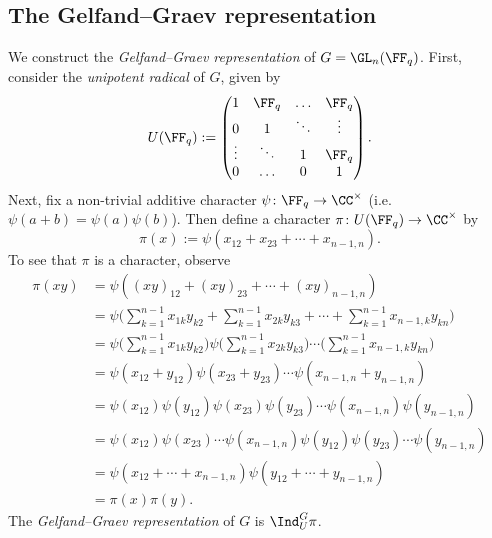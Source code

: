 \documentclass[11pt]{amsart}
\theoremstyle{remark}
\begin{document}
\subsection{The Gelfand--Graev representation}\label{Section2.4}
We construct the \emph{Gelfand--Graev representation} of $G=\GL_n(\FF_q)$.
First, consider the \emph{unipotent radical} of $G$, given by
\[
	U(\FF_q) := \begin{pmatrix}
		1      & \FF_q  & \hdots & \FF_q  \\
		0      & 1      & \ddots & \vdots \\
		\vdots & \ddots & 1      & \FF_q  \\
		0      & \hdots & 0      & 1
	\end{pmatrix}.
\]
Next, fix a non-trivial additive character $\psi\colon \FF_q\to\CC^\times$ (i.e.\ $\psi(a+b)=\psi(a)\psi(b)$).
Then define a character $\pi\colon U(\FF_q)\to\CC^\times$ by
\[
	\pi(x) := \psi(x_{12}+x_{23}+\cdots+x_{n-1,n}).
\]
To see that $\pi$ is a character, observe
\begin{align*}
	\pi(xy) & = \psi((xy)_{12} + (xy)_{23} + \cdots + (xy)_{n-1,n})                                                                                          \\
	        & = \psi\bigg(\sum_{k=1}^{n-1} x_{1k}y_{k2} + \sum_{k=1}^{n-1} x_{2k}y_{k3} + \cdots + \sum_{k=1}^{n-1} x_{n-1,k}y_{kn}\bigg)                    \\
	        & = \psi\bigg(\sum_{k=1}^{n-1} x_{1k}y_{k2}\bigg)\psi\bigg(\sum_{k=1}^{n-1} x_{2k}y_{k3}\bigg)\cdots\bigg(\sum_{k=1}^{n-1} x_{n-1,k}y_{kn}\bigg) \\
	        & = \psi(x_{12}+y_{12})\psi(x_{23}+y_{23})\cdots\psi(x_{n-1,n}+y_{n-1,n})                                                                        \\
	        & = \psi(x_{12})\psi(y_{12})\psi(x_{23})\psi(y_{23})\cdots\psi(x_{n-1,n})\psi(y_{n-1,n})                                                         \\
	        & = \psi(x_{12})\psi(x_{23})\cdots\psi(x_{n-1,n})\psi(y_{12})\psi(y_{23})\cdots\psi(y_{n-1,n})                                                   \\
	        & = \psi(x_{12} + \cdots + x_{n-1,n})\psi(y_{12} + \cdots + y_{n-1,n})                                                                           \\
	        & = \pi(x)\pi(y).
\end{align*}
The \emph{Gelfand--Graev representation} of $G$ is $\Ind_U^G \pi$.
\end{document}
